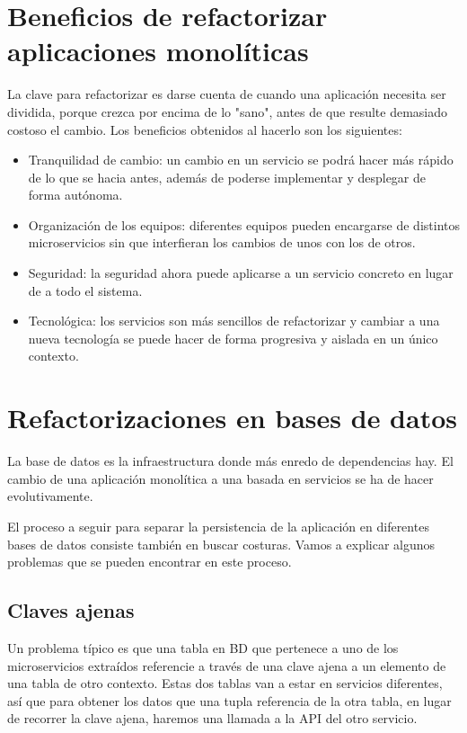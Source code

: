 \documentclass[11pt,a4paper]{article}
\begin{document}
\section{Beneficios de refactorizar aplicaciones monolíticas}

La clave para refactorizar es darse cuenta de cuando una aplicación necesita ser dividida, porque crezca por encima de lo "sano", antes de que resulte demasiado costoso el cambio. Los beneficios obtenidos al hacerlo son los siguientes:

\begin{itemize}

\item Tranquilidad de cambio: un cambio en un servicio se podrá hacer más rápido de lo que se hacia antes, además de poderse implementar y desplegar de forma autónoma.

\item Organización de los equipos: diferentes equipos pueden encargarse de distintos microservicios sin que interfieran los cambios de unos con los de otros.

\item Seguridad: la seguridad ahora puede aplicarse a un servicio concreto en lugar de a todo el sistema.

\item Tecnológica: los servicios son más sencillos de refactorizar y cambiar a una nueva tecnología se puede hacer de forma progresiva y aislada en un único contexto.

\end{itemize}


\section{Refactorizaciones en bases de datos}

La base de datos es la infraestructura donde más enredo de dependencias hay. El cambio de una aplicación monolítica a una basada en servicios se ha de hacer evolutivamente.

El proceso a seguir para separar la persistencia de la aplicación en diferentes bases de datos consiste también en buscar costuras. Vamos a explicar algunos problemas que se pueden encontrar en este proceso.

\subsection{Claves ajenas}

Un problema típico es que una tabla en BD que pertenece a uno de los microservicios extraídos referencie a través de una clave ajena a un elemento de una tabla de otro contexto. Estas dos tablas van a estar en servicios diferentes, así que para obtener los datos que una tupla referencia de la otra tabla, en lugar de recorrer la clave ajena, haremos una llamada a la API del otro servicio. 
\end{document}
